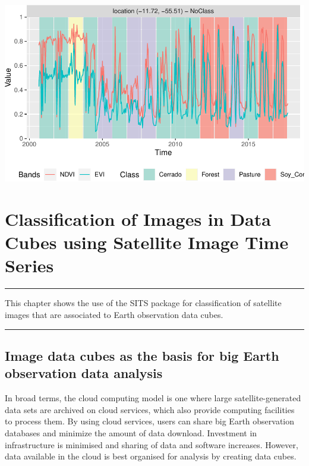 \documentclass[a4paper,]{tufte-book}
\begin{document}
\begin{center}\includegraphics[width=0.7\linewidth]{sitsbook_files/figure-latex/unnamed-chunk-63-1} \end{center}

\hypertarget{classification-of-images-in-data-cubes-using-satellite-image-time-series}{%
\chapter{Classification of Images in Data Cubes using Satellite Image Time Series}\label{classification-of-images-in-data-cubes-using-satellite-image-time-series}}

\begin{center}\rule{0.5\linewidth}{0.5pt}\end{center}

This chapter shows the use of the SITS package for classification of satellite images that are associated to Earth observation data cubes.

\begin{center}\rule{0.5\linewidth}{0.5pt}\end{center}

\hypertarget{image-data-cubes-as-the-basis-for-big-earth-observation-data-analysis-1}{%
\section{Image data cubes as the basis for big Earth observation data analysis}\label{image-data-cubes-as-the-basis-for-big-earth-observation-data-analysis-1}}

In broad terms, the cloud computing model is one where large satellite-generated data sets are archived on cloud services, which also provide computing facilities to process them. By using cloud services, users can share big Earth observation databases and minimize the amount of data download. Investment in infrastructure is minimised and sharing of data and software increases. However, data available in the cloud is best organised for analysis by creating data cubes.
\end{document}
